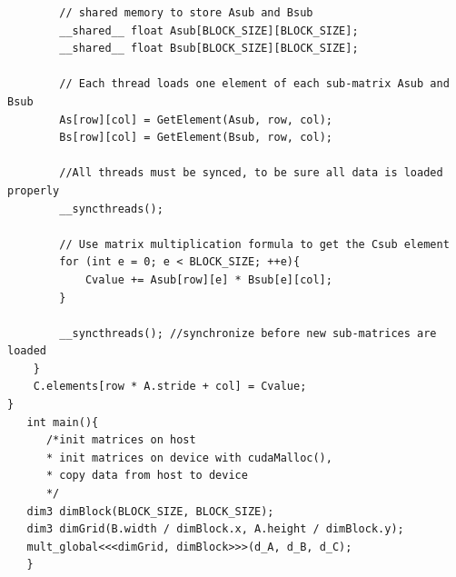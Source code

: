 {\begin{verbatim}
        // shared memory to store Asub and Bsub
        __shared__ float Asub[BLOCK_SIZE][BLOCK_SIZE];
        __shared__ float Bsub[BLOCK_SIZE][BLOCK_SIZE];

        // Each thread loads one element of each sub-matrix Asub and Bsub
        As[row][col] = GetElement(Asub, row, col);
        Bs[row][col] = GetElement(Bsub, row, col);

        //All threads must be synced, to be sure all data is loaded properly
        __syncthreads();

        // Use matrix multiplication formula to get the Csub element
        for (int e = 0; e < BLOCK_SIZE; ++e){
            Cvalue += Asub[row][e] * Bsub[e][col];
        }

        __syncthreads(); //synchronize before new sub-matrices are loaded
    }
    C.elements[row * A.stride + col] = Cvalue;
}
   int main(){
      /*init matrices on host
      * init matrices on device with cudaMalloc(),
      * copy data from host to device
      */
   dim3 dimBlock(BLOCK_SIZE, BLOCK_SIZE);
   dim3 dimGrid(B.width / dimBlock.x, A.height / dimBlock.y);
   mult_global<<<dimGrid, dimBlock>>>(d_A, d_B, d_C);
   }
\end{verbatim}

}

